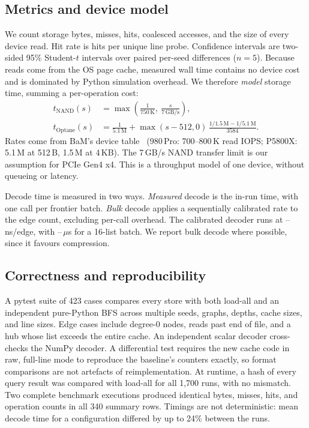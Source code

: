 \documentclass[sigconf,nonacm]{acmart}
\begin{document}
\subsection{Metrics and device model}
We count storage bytes, misses, hits, coalesced accesses, and the size of every device read. Hit rate is hits per unique line probe. Confidence intervals are two-sided 95\% Student-$t$ intervals over paired per-seed
differences ($n=5$). Because reads come from the OS page cache, measured wall time contains no device cost and is dominated by Python
simulation overhead. We therefore \emph{model} storage time, summing a per-operation cost:
\begin{align}
  t_{\mathrm{NAND}}(s) &= \max\left(\frac{1}{750\,\mathrm{K}},\ \frac{s}{7\,\mathrm{GB/s}}\right),\\
  t_{\mathrm{Optane}}(s) &= \frac{1}{5.1\,\mathrm{M}} + \max(s-512,0)\,\frac{1/1.5\,\mathrm{M} - 1/5.1\,\mathrm{M}}{3584}.
\end{align}
Rates come from BaM's device table~\cite{bam} (980\,Pro: 700--800\,K read IOPS; P5800X: 5.1\,M at 512\,B, 1.5\,M at 4\,KB). The 7\,GB/s NAND transfer limit is
our assumption for PCIe Gen4 x4. This is a throughput model of one device, without queueing or latency.

Decode time is measured in two ways. \emph{Measured} decode is the in-run time, with one call per frontier batch. \emph{Bulk} decode applies a sequentially calibrated
rate to the edge count, excluding per-call overhead. The calibrated decoder runs at \nsMin--\nsMax\,ns/edge, with \usMin--\usMax\,$\mu$s for a 16-list batch. We report bulk decode where possible,
since it favours compression.

\subsection{Correctness and reproducibility}
A pytest suite of 423 cases compares every store with both load-all and an independent pure-Python BFS across multiple seeds, graphs, depths, cache sizes, and line sizes. Edge cases include
degree-0 nodes, reads past end of file, and a hub whose list exceeds the entire cache. An independent scalar decoder cross-checks the NumPy decoder. A differential test requires the new cache code in raw, full-line mode to reproduce
the baseline's counters exactly, so format comparisons are not artefacts of reimplementation. At runtime, a hash of every query result was compared with load-all for all 1,700 runs, with no mismatch.
Two complete benchmark executions produced identical bytes, misses, hits, and operation counts in all 340 summary rows. Timings are not deterministic: mean decode time for a configuration differed by up to 24\% between the runs.
\end{document}
